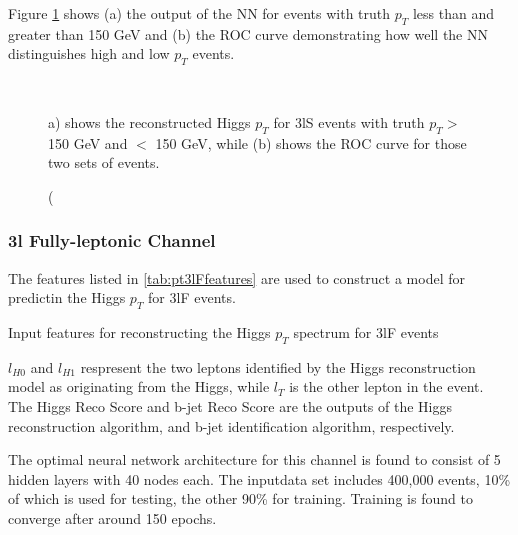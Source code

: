 Figure \ref{fig:pt3lSroc} shows (a) the output of the NN for events with truth $p_T$ less than and greater than 150 GeV and (b) the ROC curve demonstrating how well the NN distinguishes high and low $p_T$ events. 

\begin{figure}[H]                                                                    
    \centering                                                                                     
    \\
    \caption(a) shows the reconstructed Higgs $p_T$ for 3lS events with truth $p_T > $ 150 GeV and $<$ 150 GeV, while (b) shows the ROC curve for those two sets of events.
    \label{fig:pt3lSroc}
\end{figure}


\subsubsection{3l Fully-leptonic Channel}
\label{subsec:pt3lF}

The features listed in \ref{tab:pt3lFfeatures} are used to construct a model for predictin the Higgs $p_T$ for 3lF events.

\begin{table}[H]

  \caption{Input features for reconstructing the Higgs $p_T$ spectrum for 3lF events}
  \label{tab:pt3lFfeatures}
\end{table}

$l_{H0}$ and $l_{H1}$ respresent the two leptons identified by the Higgs reconstruction model as originating from the Higgs, while $l_T$ is the other lepton in the event. The Higgs Reco Score and b-jet Reco Score are the outputs of the Higgs reconstruction algorithm, and b-jet identification algorithm, respectively.

The optimal neural network architecture for this channel is found to consist of 5 hidden layers with 40 nodes each. The inputdata set includes 400,000 events, 10\% of which is used for testing, the other 90\% for training. Training is found to converge after around 150 epochs.

